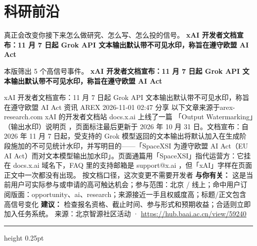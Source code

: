 \documentclass[10.5pt]{ctexart}
\begin{document}
\section*{科研前沿}
{\color{ormuted} 真正会改变你接下来怎么做研究、怎么写、怎么投的信号。}
\vspace{2mm}
{\LARGE\bfseries xAI 开发者文档宣布：11 月 7 日起 Grok API 文本输出默认带不可见水印，称旨在遵守欧盟 AI Act}\par
\vspace{1mm}
{\color{ormuted} 本版筛出 5 个高信号事件。}
\vspace{3mm}
{\Large\bfseries xAI 开发者文档宣布：11 月 7 日起 Grok API 文本输出默认带不可见水印，称旨在遵守欧盟 AI Act}\par
xAI 开发者文档宣布：11 月 7 日起 Grok API 文本输出默认带不可见水印，称旨在遵守欧盟 AI Act 资讯 AREX 2026-11-01 02:47 分享 以下文章来源于arex-research.com xAI 的开发者文档站 docs.x.ai 上线了一篇 「Output Watermarking」（输出水印）说明页 ，页面标注最后更新于 2026 年 10 月 31 日。文档宣布：自 2026 年 11 月 7 日起，受支持的 Grok 模型返回的文本输出将默认加入在生成阶段施加的不可见统计水印，并写明目的——「SpaceXSI 为遵守欧盟 AI Act（EU AI Act）而对文本模型输出加水印」。页面通篇用「SpaceXSI」指代运营方：它挂在 docs.x.ai 域名下，FAQ 里的支持邮箱是 support@x.ai ，但「xAI」字样在页面正文中一次都没有出现。 按文档口径，这次变更不需要开发者
\textbf{与你有关：} 这是当前用户可实际参与或申请的高可触达机会；参与范围：北京 / 线上；命中用户订阅版面：opportunity、ai、research；来源接近一手且权威度高；标题/正文包含高信号变化
\textbf{建议：} 检查报名资格、截止时间、参与形式和预期收益；合适则立即加入任务系统。
{\footnotesize\color{ormuted} 来源：北京智源社区活动 · \url{https://hub.baai.ac.cn/view/59240}}
\vspace{4mm}
\hrule height 0.25pt
\vspace{3mm}
\end{document}
